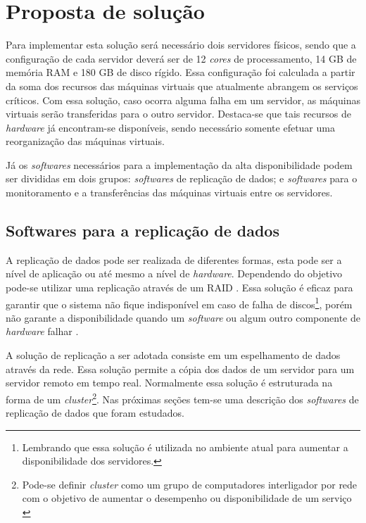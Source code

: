 \section{Proposta de solução}
\label{section:propostasolucao}

Para implementar esta solução será necessário dois servidores físicos, sendo que a configuração de cada servidor deverá ser de 
12 \textit{cores} de processamento, 14 GB de memória \ac{RAM} e 180 GB de disco rígido. Essa configuração foi calculada a partir da soma dos 
recursos das máquinas virtuais que atualmente abrangem os serviços críticos. Com essa solução, caso ocorra alguma falha em um servidor, as 
máquinas virtuais serão transferidas para o outro servidor. Destaca-se que tais recursos de \textit{hardware} já encontram-se disponíveis, 
sendo necessário somente efetuar uma reorganização das máquinas virtuais.

Já os \textit{softwares} necessários para a implementação da alta disponibilidade podem ser divididas em dois grupos: \textit{softwares} de 
replicação de dados; e \textit{softwares} para o monitoramento e a transferências das máquinas virtuais entre os servidores.

\subsection{Softwares para a replicação de dados}
\label{section:toolrepl}

A replicação de dados pode ser realizada de diferentes formas, esta pode ser a nível de aplicação ou até mesmo a nível de \textit{hardware}.
Dependendo do objetivo pode-se utilizar uma replicação através de um \ac{RAID} \cite{tanenbaum2009sistemas}. Essa solução é eficaz para garantir 
que o sistema não fique indisponível em caso de falha de discos\footnote[1]{Lembrando que essa solução é utilizada no ambiente atual para 
aumentar a disponibilidade dos servidores.}, porém não garante a disponibilidade quando um \textit{software} ou algum outro componente de 
\textit{hardware} falhar \cite{zaminhani2008}.

A solução de replicação a ser adotada consiste em um espelhamento de dados através da rede. Essa solução permite a cópia dos dados de um servidor
para um servidor remoto em tempo real. Normalmente essa solução é estruturada na forma de um \textit{cluster}\footnote[2]{Pode-se definir 
\textit{cluster} como um grupo de computadores interligador por rede com o objetivo de aumentar o desempenho ou disponibilidade de um serviço 
\cite{freitas2005}}.
Nas próximas seções tem-se uma descrição dos \textit{softwares} de replicação de dados que foram estudados.

